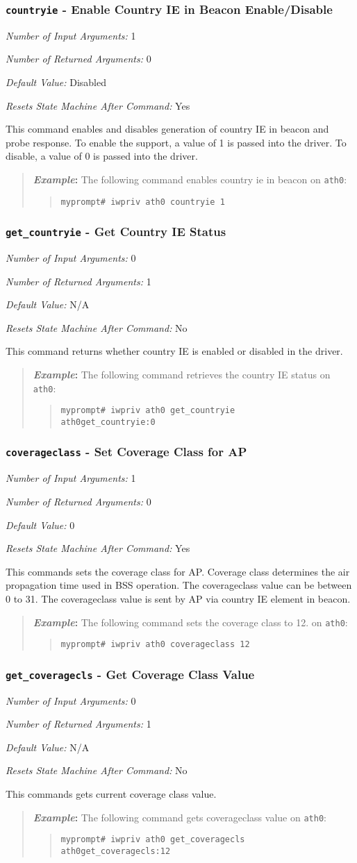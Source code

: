 \documentclass[10pt,fullpage]{article}
\newcommand{\mytt}[1]{{\texttt{#1}}}
\newcommand{\bv}{\begin{verse}}
\newcommand{\ev}{\end{verse}}
\newcommand{\cmd}[1]{{\texttt{myprompt\# #1}}}
\newcommand{\argdesc}[4]{\begin{description}
\itemsep -6pt
\item \textit{Number of Input Arguments:} #1
\item \textit{Number of Returned Arguments:} #2
\item \textit{Default Value:} #3
\item \textit{Resets State Machine After Command:} #4
\end{description}
}
\newenvironment{example}{\begin{quote}\textbf{\textit{Example}:}}{\end{quote}}
\begin{document}
\subsubsection{\mytt{countryie} - Enable Country IE in Beacon Enable/Disable}
\argdesc{1}{0}{Disabled}{Yes}
This command enables and disables generation of country IE in beacon and probe
response.  To enable the support, a value of 1 is passed into the driver. 
To disable, a value of 0 is passed into the driver.
\begin{example}
  The following command enables country ie in beacon  on \mytt{ath0}:
  \bv
  \cmd{iwpriv ath0 countryie 1}
  \ev
\end{example}

\subsubsection{\mytt{get\_countryie} - Get Country IE Status}
\argdesc{0}{1}{N/A}{No}
This command returns whether country IE is enabled or disabled in
the driver.
\begin{example}
  The following command retrieves the country IE status on \mytt{ath0}:
  \bv
  \cmd{iwpriv ath0 get\_countryie}\\
  \mytt{ath0\hspace{32pt}get\_countryie:0}
  \ev
\end{example}

\subsubsection{\mytt{coverageclass} - Set Coverage Class for AP}
\argdesc{1}{0}{0}{Yes}
This commands sets the coverage class for AP. Coverage class determines the
air propagation time used in BSS operation. The coverageclass value can be 
between 0 to 31. The coverageclass value is sent by AP via country IE
element in beacon.
\begin{example}
  The following command sets the coverage class to 12.
  on \mytt{ath0}:
  \bv
  \cmd{iwpriv ath0 coverageclass 12}\\
  \ev
\end{example}

\subsubsection{\mytt{get\_coveragecls} - Get Coverage Class Value}
\argdesc{0}{1}{N/A}{No}
This commands gets current coverage class value.
\begin{example}
  The following command gets coverageclass value
  on \mytt{ath0}:
  \bv
  \cmd{iwpriv ath0 get\_coveragecls}\\
  \mytt{ath0\hspace{32pt}get\_coveragecls:12}
  \ev
\end{example}
\end{document}
